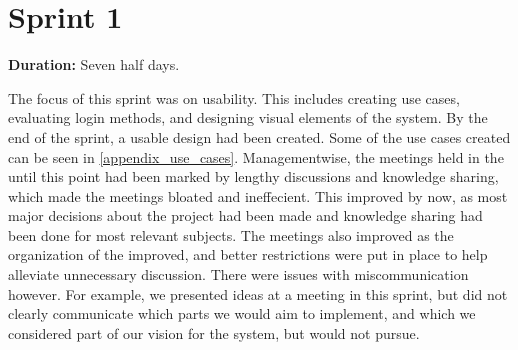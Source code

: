 \section{Sprint 1}%
\label{iterative:sprint1}

\textbf{Duration:} Seven half days. \newline

The focus of this sprint was on usability. 
This includes creating use cases, evaluating login methods, and designing visual elements of the system. 
By the end of the sprint, a usable design had been created. 
Some of the use cases created can be seen in \autoref{appendix_use_cases}. \newline
Managementwise, the meetings held in the \globalgroup{} until this point had been marked by lengthy discussions and knowledge sharing, which made the meetings bloated and ineffecient. 
This improved by now, as most major decisions about the project had been made and knowledge sharing had been done for most relevant subjects. 
The meetings also improved as the organization of the \globalgroup{} improved, and better restrictions were put in place to help alleviate unnecessary discussion. \newline
There were issues with miscommunication however. 
For example, we presented ideas at a meeting in this sprint, but did not clearly communicate which parts we would aim to implement, and which we considered part of our vision for the system, but would not pursue. 